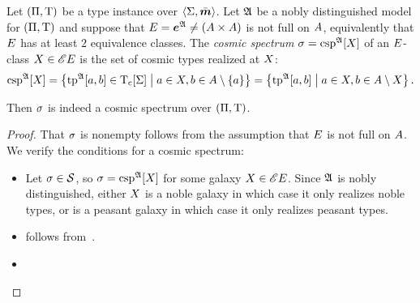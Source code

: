 \begin{definition}
Let $(\Pi,\mathrm{T})$ be a type instance over $\left\langle \mathrm{\Sigma},\bar{\bm{m}} \right\rangle$.
Let $\mathfrak{A}$ be a nobly distinguished model for $(\Pi,\mathrm{T})$ and suppose that
$E = \bm{e}^{\mathfrak{A}} \neq ({A\times A})$ is not full on $A$, equivalently that $E$ has at least
$2$ equivalence classes.
The \emph{cosmic spectrum} $\sigma = \operatorname{csp}^{\mathfrak{A}}[X]$ of an $E$-class
$X \in {\mathscr{E}E}$ is the set of cosmic types realized at $X$:
\[
  \operatorname{csp}^{\mathfrak{A}}[X] = \left\{\operatorname{tp}^{\mathfrak{A}}[a,b] \in \mathrm{T}_{\mathrm{c}}[\mathrm{\Sigma}]\mathrel{}\middle|\mathrel{}a\in X, b 
  \in A\setminus\left\{a\right\}\right\} = \left\{\operatorname{tp}^{\mathfrak{A}}[a,b]\mathrel{}\middle|\mathrel{}a \in X, b \in
  A \setminus X\right\}.
\]
\end{definition}
\begin{remark}
Then $\sigma$ is indeed a cosmic spectrum over $(\Pi,\mathrm{T})$.
\end{remark}
\begin{proof}
That $\sigma$ is nonempty follows from the assumption that $E$ is not full on
$A$. We verify the conditions for a cosmic spectrum:
\begin{itemize}
  \item[\refcondcspx] 
  Let $\sigma \in \mathcal{S}$, so $\sigma = \operatorname{csp}^{\mathfrak{A}}[X]$ for some galaxy $X
  \in {\mathscr{E}E}$. Since $\mathfrak{A}$ is nobly distinguished, either $X$ is a
  noble galaxy in which case it only realizes noble types, or is a peasant
  galaxy in which case it only realizes peasant types.
  \item[\refcondcspnx]
  follows from~.
  \item[\refcondcspny]
  
\end{itemize}
\end{proof}

